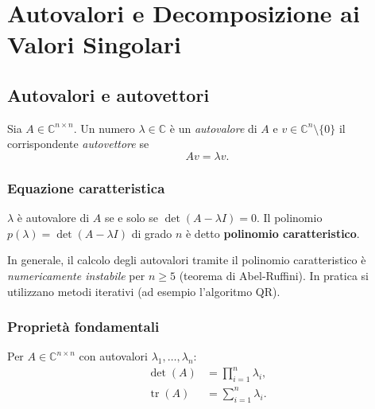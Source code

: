 \chapter{Autovalori e Decomposizione ai Valori Singolari}
\label{ch:autovalori}

\section{Autovalori e autovettori}
\label{sec:autovalori}

\begin{definition}
Sia $A \in \mathbb{C}^{n \times n}$. Un numero $\lambda \in \mathbb{C}$ è un
\emph{autovalore} di $A$ e $v \in \mathbb{C}^n \setminus \{0\}$ il corrispondente
\emph{autovettore} se
\begin{equation}
  Av = \lambda v.
  \label{eq:autovettore}
\end{equation}
\end{definition}

\subsection{Equazione caratteristica}

$\lambda$ è autovalore di $A$ se e solo se $\det(A - \lambda I) = 0$.
Il polinomio $p(\lambda) = \det(A - \lambda I)$ di grado $n$ è detto
\textbf{polinomio caratteristico}.

\begin{remark}
In generale, il calcolo degli autovalori tramite il polinomio caratteristico è
\emph{numericamente instabile} per $n \geq 5$ (teorema di Abel-Ruffini). In pratica
si utilizzano metodi iterativi (ad esempio l'algoritmo QR).
\end{remark}

\subsection{Proprietà fondamentali}

Per $A \in \mathbb{C}^{n \times n}$ con autovalori $\lambda_1, \ldots, \lambda_n$:
\begin{align}
  \det(A)  &= \prod_{i=1}^n \lambda_i, \label{eq:det_autoval}\\
  \operatorname{tr}(A) &= \sum_{i=1}^n \lambda_i. \label{eq:traccia}
\end{align}

